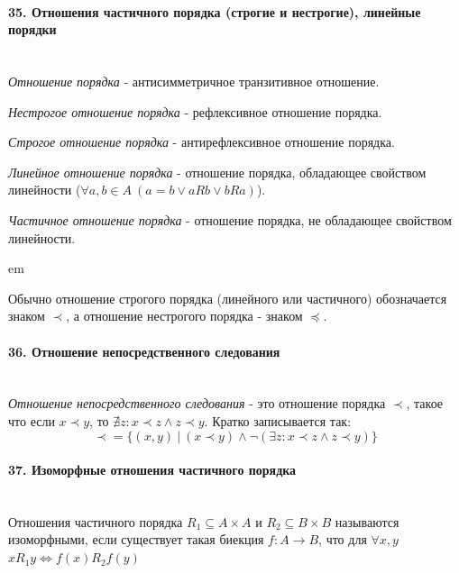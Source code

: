 \documentclass[a4paper, 12pt]{article}
\newcommand{\parag}[1]{\paragraph{#1}\mbox{}\\}
\begin{document}
\parag{35. Отношения частичного порядка (строгие и нестрогие), линейные порядки}
\textit{Отношение порядка} - антисимметричное транзитивное отношение.

\noindent
\textit{Нестрогое отношение порядка} - рефлексивное отношение порядка.

\noindent
\textit{Строгое отношение порядка} - антирефлексивное отношение порядка.

\noindent
\textit{Линейное отношение порядка} - отношение порядка, обладающее свойством линейности ($\forall a, b \in A\ (a = b \lor aRb \lor bRa)$).

\noindent
\textit{Частичное отношение порядка} - отношение порядка, не обладающее свойством линейности.

 em

Обычно отношение строгого порядка (линейного или частичного) обозначается знаком $\prec$, а отношение нестрогого порядка - знаком $\preceq$.

\parag{36. Отношение непосредственного следования}
\textit{Отношение непосредственного следования} - это отношение порядка $\prec$, такое что если $x \prec y$, то $\nexists z: x \prec z \land z \prec y$. Кратко записывается так:
\[
    \prec = \{(x, y)\ |\ (x \prec y) \land \neg(\exists z: x \prec z \land z \prec y)\}
\]

\parag{37. Изоморфные отношения частичного порядка}
Отношения частичного порядка $R_{1} \subseteq A \times A$ и $R_{2} \subseteq B \times B$ называются изоморфными, если существует такая биекция $f : A \rightarrow B$, что для $\forall x, y$ $xR_{1}y \iff f(x)R_{2}f(y)$
\end{document}
